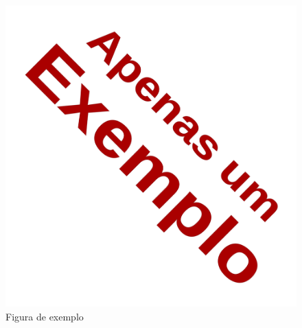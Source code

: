 \begin{figure}[htb]
	\caption{\label{exemplo}Figura de exemplo}
	\begin{center}
	\includegraphics[scale=0.20]{textual/exemplo.png}
	\end{center}
\end{figure}

